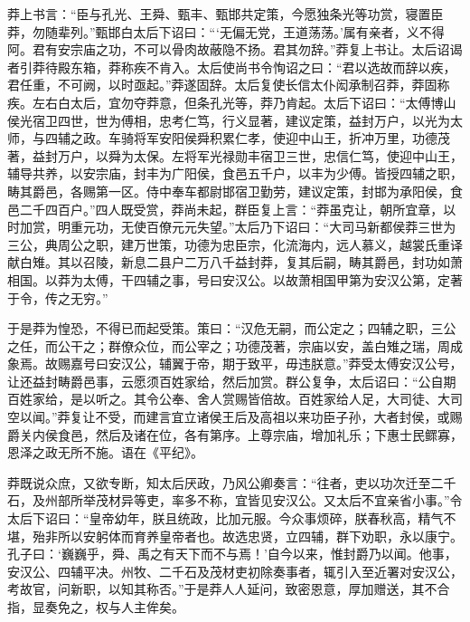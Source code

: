 \documentclass[12pt,UTF8]{ctexbook}
\begin{document}
莽上书言：“臣与孔光、王舜、甄丰、甄邯共定策，今愿独条光等功赏，寝置臣莽，勿随辈列。”甄邯白太后下诏曰：“‘无偏无党，王道荡荡。’属有亲者，义不得阿。君有安宗庙之功，不可以骨肉故蔽隐不扬。君其勿辞。”莽复上书让。太后诏谒者引莽待殿东箱，莽称疾不肯入。太后使尚书令恂诏之曰：“君以选故而辞以疾，君任重，不可阙，以时亟起。”莽遂固辞。太后复使长信太仆闳承制召莽，莽固称疾。左右白太后，宜勿夺莽意，但条孔光等，莽乃肯起。太后下诏曰：“太傅博山侯光宿卫四世，世为傅相，忠考仁笃，行义显著，建议定策，益封万户，以光为太师，与四辅之政。车骑将军安阳侯舜积累仁孝，使迎中山王，折冲万里，功德茂著，益封万户，以舜为太保。左将军光禄勋丰宿卫三世，忠信仁笃，使迎中山王，辅导共养，以安宗庙，封丰为广阳侯，食邑五千户，以丰为少傅。皆授四辅之职，畴其爵邑，各赐第一区。侍中奉车都尉邯宿卫勤劳，建议定策，封邯为承阳侯，食邑二千四百户。”四人既受赏，莽尚未起，群臣复上言：“莽虽克让，朝所宜章，以时加赏，明重元功，无使百僚元元失望。”太后乃下诏曰：“大司马新都侯莽三世为三公，典周公之职，建万世策，功德为忠臣宗，化流海内，远人慕义，越裳氏重译献白雉。其以召陵，新息二县户二万八千益封莽，复其后嗣，畴其爵邑，封功如萧相国。以莽为太傅，干四辅之事，号曰安汉公。以故萧相国甲第为安汉公第，定著于令，传之无穷。”



于是莽为惶恐，不得已而起受策。策曰：“汉危无嗣，而公定之；四辅之职，三公之任，而公干之；群僚众位，而公宰之；功德茂著，宗庙以安，盖白雉之瑞，周成象焉。故赐嘉号曰安汉公，辅翼于帝，期于致平，毋违朕意。”莽受太傅安汉公号，让还益封畴爵邑事，云愿须百姓家给，然后加赏。群公复争，太后诏曰：“公自期百姓家给，是以听之。其令公奉、舍人赏赐皆倍故。百姓家给人足，大司徒、大司空以闻。”莽复让不受，而建言宜立诸侯王后及高祖以来功臣子孙，大者封侯，或赐爵关内侯食邑，然后及诸在位，各有第序。上尊宗庙，增加礼乐；下惠士民鳏寡，恩泽之政无所不施。语在《平纪》。



莽既说众庶，又欲专断，知太后厌政，乃风公卿奏言：“往者，吏以功次迁至二千石，及州部所举茂材异等吏，率多不称，宜皆见安汉公。又太后不宜亲省小事。”令太后下诏曰：“皇帝幼年，朕且统政，比加元服。今众事烦碎，朕春秋高，精气不堪，殆非所以安躬体而育养皇帝者也。故选忠贤，立四辅，群下劝职，永以康宁。孔子曰：‘巍巍乎，舜、禹之有天下而不与焉！’自今以来，惟封爵乃以闻。他事，安汉公、四辅平决。州牧、二千石及茂材吏初除奏事者，辄引入至近署对安汉公，考故官，问新职，以知其称否。”于是莽人人延问，致密恩意，厚加赠送，其不合指，显奏免之，权与人主侔矣。
\end{document}
